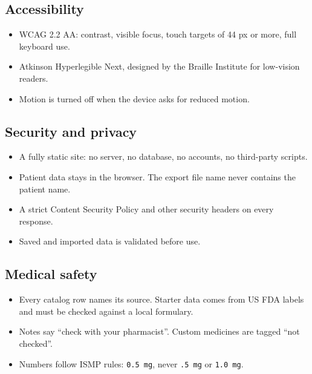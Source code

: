 \documentclass[11pt]{article}
\begin{document}
\subsection{Accessibility}
\begin{itemize}
  \item WCAG 2.2 AA: contrast, visible focus, touch targets of 44 px or more, full keyboard use.
  \item Atkinson Hyperlegible Next, designed by the Braille Institute for low-vision readers.
  \item Motion is turned off when the device asks for reduced motion.
\end{itemize}
\subsection{Security and privacy}
\begin{itemize}
  \item A fully static site: no server, no database, no accounts, no third-party scripts.
  \item Patient data stays in the browser. The export file name never contains the patient name.
  \item A strict Content Security Policy and other security headers on every response.
  \item Saved and imported data is validated before use.
\end{itemize}
\subsection{Medical safety}
\begin{itemize}
  \item Every catalog row names its source. Starter data comes from US FDA labels and must be checked against a local formulary.
  \item Notes say ``check with your pharmacist''. Custom medicines are tagged ``not checked''.
  \item Numbers follow ISMP rules: \texttt{0.5 mg}, never \texttt{.5 mg} or \texttt{1.0 mg}.
\end{itemize}
\end{document}
